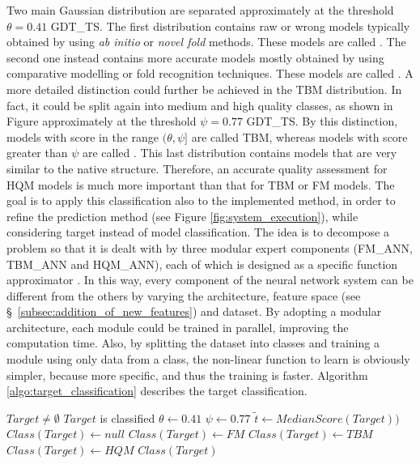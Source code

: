Two main Gaussian distribution are separated approximately at the threshold $\theta = 0.41$ GDT\_TS. The first distribution contains raw or wrong models typically obtained by using \emph{ab initio} or \emph{novel fold} methods. These models are called . The second one instead contains more accurate models mostly obtained by using comparative modelling or fold recognition techniques. These models are called . A more detailed distinction could further be achieved in the TBM distribution. In fact, it could be split again into medium and high quality classes, as shown in Figure approximately at the threshold $\psi = 0.77$ GDT\_TS. By this distinction, models with score in the range $(\theta,\psi]$ are called TBM, whereas models with score greater than $\psi$ are called . This last distribution contains models that are very similar to the native structure. Therefore, an accurate quality assessment for HQM models is much more important than that for TBM or FM models. The goal is to apply this classification also to the implemented method, in order to refine the prediction method (see Figure \ref{fig:system_execution}), while considering target instead of model classification. The idea is to decompose a problem so that it is dealt with by three modular expert components (FM\_ANN, TBM\_ANN and HQM\_ANN), each of which is designed as a specific function approximator \cite{Sharkey96aa,MuiAGW94aa,FrosyniotisSL03aa,Happel1994aa,Schmidt1996aa}. In this way, every component of the neural network system can be different from the others by varying the architecture, feature space (see \S~\ref{subsec:addition_of_new_features}) and dataset. By adopting a modular architecture, each module could be trained in parallel, improving the computation time. Also, by splitting the dataset into classes and training a module using only data from a class, the non-linear function to learn is obviously simpler, because more specific, and thus the training is faster. 
Algorithm \ref{algo:target_classification} describes the target classification.
\begin{algorithm}
\caption{$ClassifyTarget(Target)$}
\label{algo:target_classification}
\begin{algorithmic}[1]
\REQUIRE $Target \neq \emptyset$
\ENSURE $Target$ is classified
\STATE $\theta \leftarrow 0.41$
\STATE $\psi \leftarrow 0.77$
\STATE $\tilde{t} \leftarrow MedianScore(Target))$
\STATE $Class(Target) \leftarrow null$
	\STATE $Class(Target) \leftarrow FM$
	\STATE $Class(Target) \leftarrow TBM$
	\STATE $Class(Target) \leftarrow HQM$
\ENDIF
\RETURN $Class(Target)$
\end{algorithmic}
\end{algorithm}
